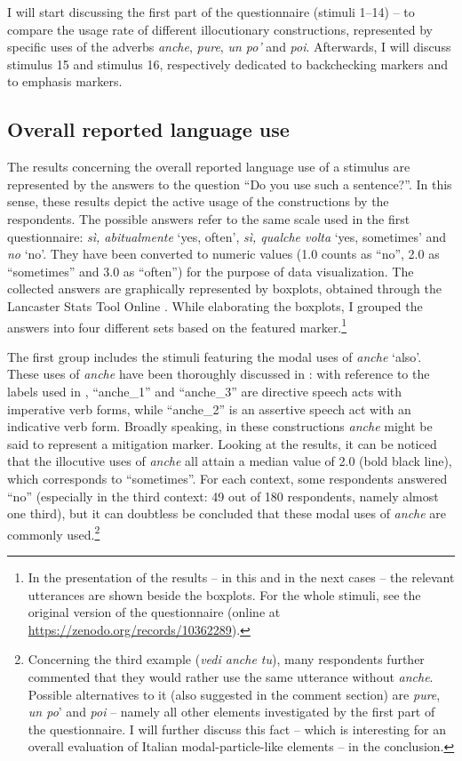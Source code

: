 \newpage
I will start discussing the first part of the questionnaire (stimuli 1–14) – to compare the usage rate of different illocutionary constructions, represented by specific uses of the adverbs \textit{anche}, \textit{pure}, \textit{un po’} and \textit{poi}. Afterwards, I will discuss stimulus 15 and stimulus 16, respectively dedicated to backchecking markers and to emphasis markers.

\subsection{Overall reported language use}\largerpage[-2]
\hypertarget{Toc124860686}{}
The results concerning the overall reported language use of a stimulus are represented by the answers to the question “Do you use such a sentence?”. In this sense, these results depict the active usage of the constructions by the respondents. The possible answers refer to the same scale used in the first questionnaire: \textit{sì, abitualmente} ‘yes, often’, \textit{sì, qualche volta} ‘yes, sometimes’ and \textit{no} ‘no’. They have been converted to numeric values (1.0 counts as “no”, 2.0 as “sometimes” and 3.0 as “often”) for the purpose of data visualization. The collected answers are graphically represented by boxplots, obtained through the Lancaster Stats Tool Online \citep{Brezina2018}. While elaborating the boxplots, I grouped the answers into four different sets based on the featured marker.\footnote{In the presentation of the results – in this and in the next cases – the relevant utterances are shown beside the boxplots. For the whole stimuli, see the original version of the questionnaire (online at \url{https://zenodo.org/records/10362289}).}

The first group includes the stimuli featuring the modal uses of \textit{anche} ‘also’. These uses of \textit{anche} have been thoroughly discussed in : with reference to the labels used in , “anche\_1” and “anche\_3” are directive speech acts with imperative verb forms, while “anche\_2” is an assertive speech act with an indicative verb form. Broadly speaking, in these constructions \textit{anche} might be said to represent a mitigation marker. Looking at the results, it can be noticed that the illocutive uses of \textit{anche} all attain a median value of 2.0 (bold black line), which corresponds to “sometimes”. For each context, some respondents answered “no” (especially in the third context: 49 out of 180 respondents, namely almost one third), but it can doubtless be concluded that these modal uses of \textit{anche} are commonly used.\footnote{Concerning the third example (\textit{vedi anche tu}), many respondents further commented that they would rather use the same utterance without \textit{anche}. Possible alternatives to it (also suggested in the comment section) are \textit{pure}, \textit{un po}’ and \textit{poi} – namely all other elements investigated by the first part of the questionnaire. I will further discuss this fact – which is interesting for an overall evaluation of Italian modal-particle-like elements – in the conclusion.}


